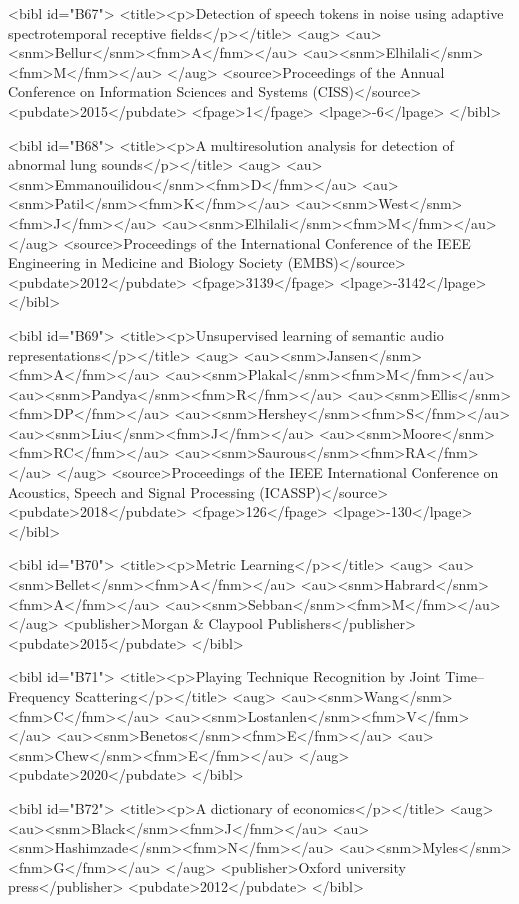 \documentclass{bmcart}
\begin{document}
\begin{backmatter}
{<bibl id="B67">
  <title><p>Detection of speech tokens in noise using adaptive spectrotemporal
  receptive fields</p></title>
  <aug>
    <au><snm>Bellur</snm><fnm>A</fnm></au>
    <au><snm>Elhilali</snm><fnm>M</fnm></au>
  </aug>
  <source>Proceedings of the Annual Conference on Information Sciences and
  Systems (CISS)</source>
  <pubdate>2015</pubdate>
  <fpage>1</fpage>
  <lpage>-6</lpage>
</bibl>

<bibl id="B68">
  <title><p>A multiresolution analysis for detection of abnormal lung
  sounds</p></title>
  <aug>
    <au><snm>Emmanouilidou</snm><fnm>D</fnm></au>
    <au><snm>Patil</snm><fnm>K</fnm></au>
    <au><snm>West</snm><fnm>J</fnm></au>
    <au><snm>Elhilali</snm><fnm>M</fnm></au>
  </aug>
  <source>Proceedings of the International Conference of the IEEE Engineering
  in Medicine and Biology Society (EMBS)</source>
  <pubdate>2012</pubdate>
  <fpage>3139</fpage>
  <lpage>-3142</lpage>
</bibl>

<bibl id="B69">
  <title><p>Unsupervised learning of semantic audio representations</p></title>
  <aug>
    <au><snm>Jansen</snm><fnm>A</fnm></au>
    <au><snm>Plakal</snm><fnm>M</fnm></au>
    <au><snm>Pandya</snm><fnm>R</fnm></au>
    <au><snm>Ellis</snm><fnm>DP</fnm></au>
    <au><snm>Hershey</snm><fnm>S</fnm></au>
    <au><snm>Liu</snm><fnm>J</fnm></au>
    <au><snm>Moore</snm><fnm>RC</fnm></au>
    <au><snm>Saurous</snm><fnm>RA</fnm></au>
  </aug>
  <source>Proceedings of the IEEE International Conference on Acoustics, Speech
  and Signal Processing (ICASSP)</source>
  <pubdate>2018</pubdate>
  <fpage>126</fpage>
  <lpage>-130</lpage>
</bibl>

<bibl id="B70">
  <title><p>{M}etric {L}earning</p></title>
  <aug>
    <au><snm>Bellet</snm><fnm>A</fnm></au>
    <au><snm>Habrard</snm><fnm>A</fnm></au>
    <au><snm>Sebban</snm><fnm>M</fnm></au>
  </aug>
  <publisher>{M}organ \& {C}laypool {P}ublishers</publisher>
  <pubdate>2015</pubdate>
</bibl>

<bibl id="B71">
  <title><p>Playing Technique Recognition by Joint Time--Frequency
  Scattering</p></title>
  <aug>
    <au><snm>Wang</snm><fnm>C</fnm></au>
    <au><snm>Lostanlen</snm><fnm>V</fnm></au>
    <au><snm>Benetos</snm><fnm>E</fnm></au>
    <au><snm>Chew</snm><fnm>E</fnm></au>
  </aug>
  <pubdate>2020</pubdate>
</bibl>

<bibl id="B72">
  <title><p>A dictionary of economics</p></title>
  <aug>
    <au><snm>Black</snm><fnm>J</fnm></au>
    <au><snm>Hashimzade</snm><fnm>N</fnm></au>
    <au><snm>Myles</snm><fnm>G</fnm></au>
  </aug>
  <publisher>Oxford university press</publisher>
  <pubdate>2012</pubdate>
</bibl>

}
\end{backmatter}
\end{document}

